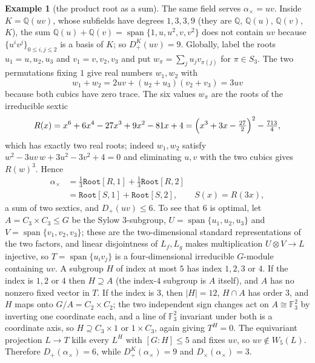 \documentclass[11pt,a4paper]{article}
\theoremstyle{definition}
\newtheorem{example}[theorem]{Example}
\theoremstyle{remark}
\newcommand{\Q}{\mathbb{Q}}
\newcommand{\F}{\mathbb{F}}
\newcommand{\Dp}{D_{+}}
\newcommand{\Dt}{D_{\times}}
\newcommand{\code}[1]{\texttt{#1}}
\newcommand{\Root}{\code{Root}}
\begin{document}
\begin{example}[the product root as a sum]\label{ex:sextic}
The same field serves $\alpha_\times=uv$.  Inside $K=\Q(uv)$, whose subfields have degrees $1,3,3,9$
(they are $\Q$, $\Q(u)$, $\Q(v)$, $K$), the sum $\Q(u)+\Q(v)=\operatorname{span}\{1,u,u^2,v,v^2\}$ does
not contain $uv$ because $\{u^iv^j\}_{0\le i,j\le2}$ is a basis of $K$; so $\Dp^K(uv)=9$.  Globally,
label the roots $u_1=u,u_2,u_3$ and $v_1=v,v_2,v_3$ and put $w_\pi=\sum_ju_jv_{\pi(j)}$ for
$\pi\in S_3$.  The two permutations fixing $1$ give real numbers $w_1,w_2$ with
\[
 w_1+w_2=2uv+(u_2+u_3)(v_2+v_3)=3uv
\]
because both cubics have zero trace.  The six values $w_\pi$ are the roots of the irreducible sextic
\begin{equation}\label{eq:R}
 R(x)=x^6+6x^4-27x^3+9x^2-81x+4=\Bigl(x^3+3x-\tfrac{27}2\Bigr)^2-\tfrac{713}4,
\end{equation}
which has exactly two real roots; indeed $w_1,w_2$ satisfy $w^2-3uv\,w+3u^2-3v^2+4=0$ and eliminating
$u,v$ with the two cubics gives $R(w)^3$.  Hence
\begin{align*}
 \alpha_\times&=\tfrac13\Root[R,1]+\tfrac13\Root[R,2]\\
 &=\Root[S,1]+\Root[S,2],\qquad S(x)=R(3x),
\end{align*}
a sum of two sextics, and $\Dp(uv)\le6$.  To see that $6$ is optimal, let $A=C_3\times C_3\le G$ be
the Sylow $3$-subgroup, $U=\operatorname{span}\{u_1,u_2,u_3\}$ and $V=\operatorname{span}\{v_1,v_2,v_3\}$;
these are the two-dimensional standard representations of the two factors, and linear disjointness of
$L_f,L_g$ makes multiplication $U\otimes V\to L$ injective, so $T=\operatorname{span}\{u_iv_j\}$ is a
four-dimensional irreducible $G$-module containing $uv$.  A subgroup $H$ of index at most $5$ has index
$1,2,3$ or $4$.  If the index is $1,2$ or $4$ then $H\supseteq A$ (the index-$4$ subgroup is $A$
itself), and $A$ has no nonzero fixed vector in $T$.  If the index is $3$, then $|H|=12$, $H\cap A$ has
order $3$, and $H$ maps onto $G/A=C_2\times C_2$; the two independent sign changes act on
$A\cong\F_3^2$ by inverting one coordinate each, and a line of $\F_3^2$ invariant under both is a
coordinate axis, so $H\supseteq C_3\times1$ or $1\times C_3$, again giving $T^H=0$.  The equivariant
projection $L\to T$ kills every $L^H$ with $[G:H]\le5$ and fixes $uv$, so $uv\notin W_5(L)$.  Therefore
$\Dp(\alpha_\times)=6$, while $\Dp^{K}(\alpha_\times)=9$ and $\Dt(\alpha_\times)=3$.
\end{example}
\end{document}
